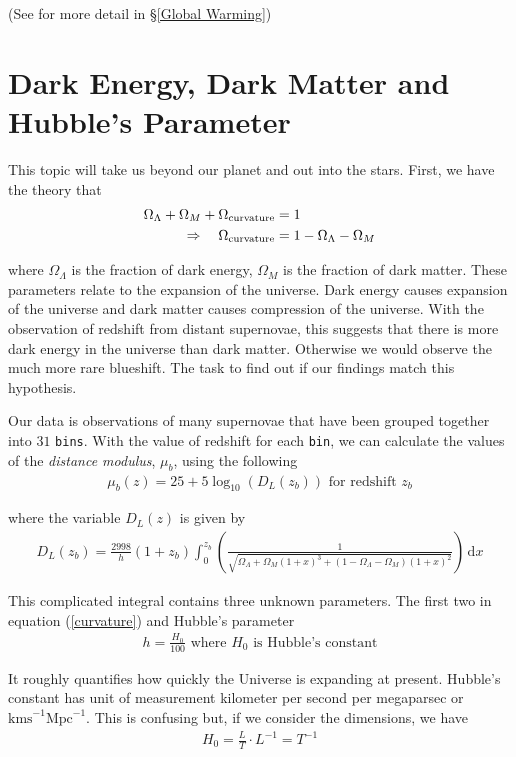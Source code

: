 \documentclass[12pt,twoside]{report}   %
\begin{document}
(See \cite{1} for more detail in \S\ref{Global Warming})

\chapter{Dark Energy, Dark Matter and Hubble's Parameter}\label{Dark Energy}

This topic will take us beyond our planet and out into the stars. First, we have the theory that
\begin{align}\label{curvature}
\Omega_\Lambda + \Omega_M + \Omega_{\text{curvature}} &= 1\notag \\
\Rightarrow\quad\Omega_{\text{curvature}} &= 1 - \Omega_\Lambda - \Omega_M
\end{align}

where $\Omega_\Lambda$ is the fraction of dark energy, $\Omega_M$ is the fraction of dark matter. These parameters relate to the expansion of the universe. Dark energy causes expansion of the universe and dark matter causes compression of the universe. With the observation of redshift from distant supernovae, this suggests that there is more dark energy in the universe than dark matter. Otherwise we would observe the much more rare blueshift. The task to find out if our findings match this hypothesis.

Our data is observations of many supernovae that have been grouped together into $31$ \texttt{bins}. With the value of redshift for each \texttt{bin}, we can calculate the values of the \textit{distance modulus}, $\mu_b$, using the following
\begin{align}\label{distance modulus}
\mu_b(z) = 25 + 5\log_{10}(D_L(z_b))\,\,\text{for redshift}\,\,z_b
\end{align}

where the variable $D_L(z)$ is given by
\begin{align*}
D_L(z_b) = \frac{2998}{h}(1+z_b)\int_0^{z_b}\left(\frac{1}{\sqrt{\Omega_\Lambda + \Omega_M(1+x)^3 + (1 - \Omega_\Lambda - \Omega_M)(1+x)^2}}\right)\,\mathrm{d}x
\end{align*}

This complicated integral contains three unknown parameters. The first two in equation (\ref{curvature}) and Hubble's parameter
\begin{align*}
h = \frac{H_0}{100}\,\,\text{where $H_0$ is Hubble's constant}
\end{align*}

It roughly quantifies how quickly the Universe is expanding at present. Hubble's constant has unit of measurement kilometer per second per megaparsec or $\mathrm{kms}^{-1}\mathrm{Mpc}^{-1}$. This is confusing but, if we consider the dimensions, we have
\begin{align*}
H_0 = \frac{L}{T}\cdot L^{-1} = T^{-1}
\end{align*}
\end{document}
